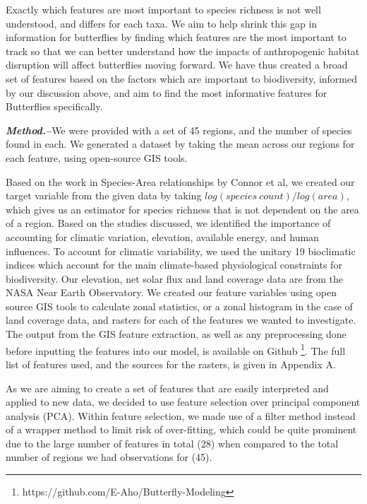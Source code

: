 \documentclass[prl,showpacs,superscriptaddress,twocolumn,longbibliography]{revtex4-1}
\begin{document}
Exactly which features are most important to species richness is not well understood, and differs for each taxa. We aim to help shrink this gap in information for butterflies by finding which features are the most important to track so that we can better understand how the impacts of anthropogenic habitat disruption will affect butterflies moving forward. We have thus created a broad set of features based on the factors which are important to biodiversity, informed by our discussion above, and aim to find the most informative features for Butterflies specifically.


\noindent 

{\bf\em Method.--}We were provided with a set of 45 regions, and the number of species found in each. We generated a dataset by taking the mean across our regions for each feature, using open-source GIS tools.

Based on the work in Species-Area relationships by Connor et al\cite{connor_2001_sar}, we created our target variable from the given data by taking $log(species \: count)/log(area)$, which gives us an estimator for species richness that is not dependent on the area of a region. Based on the studies discussed, we identified the importance of accounting for climatic variation, elevation, available energy, and human influences.  To account for climatic variability, we used the unitary 19 bioclimatic indices which account for the main climate-based physiological constraints for biodiversity\cite{hijmans_very_2005}. Our elevation, net solar flux and land coverage data are from the NASA Near Earth Observatory. We created our feature variables using open source GIS tools\cite{QGIS_software} to calculate zonal statistics, or a zonal histogram in the case of land coverage data, and rasters for each of the features we wanted to investigate. The output from the GIS feature extraction, as well as any preprocessing done before inputting the features into our model, is available on Github \footnote{https://github.com/E-Aho/Butterfly-Modeling}. The full list of features used, and the sources for the rasters, is given in Appendix A.

As we are aiming to create a set of features that are easily interpreted and applied to new data, we decided to use feature selection over principal component analysis (PCA). Within feature selection, we made use of a filter method instead of a wrapper method to limit risk of over-fitting, which could be quite prominent due to the large number of features in total (28) when compared to the total number of regions we had observations for (45).
\end{document}
